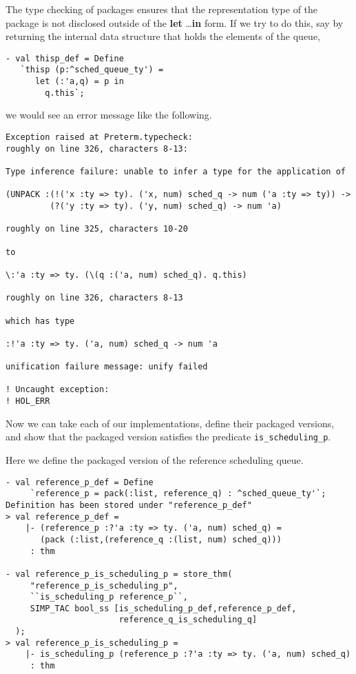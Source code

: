 The type checking of packages ensures that the representation
type of the package is not disclosed outside of the
{\bf let} \ldots {\bf in} form. If we try to do this,
say by returning the internal data structure that holds
the elements of the queue,
\begin{session}
\begin{verbatim}
- val thisp_def = Define
   `thisp (p:^sched_queue_ty') =
      let (:'a,q) = p in
        q.this`;
\end{verbatim}
\end{session}

\noindent
we would see an error message like the following.
\begin{session}
\begin{verbatim}
Exception raised at Preterm.typecheck:
roughly on line 326, characters 8-13:

Type inference failure: unable to infer a type for the application of

(UNPACK :(!('x :ty => ty). ('x, num) sched_q -> num ('a :ty => ty)) ->
         (?('y :ty => ty). ('y, num) sched_q) -> num 'a)

roughly on line 325, characters 10-20

to

\:'a :ty => ty. (\(q :('a, num) sched_q). q.this)

roughly on line 326, characters 8-13

which has type

:!'a :ty => ty. ('a, num) sched_q -> num 'a

unification failure message: unify failed

! Uncaught exception: 
! HOL_ERR
\end{verbatim}
\end{session}

Now we can take each of our implementations, define their
packaged versions, and show that the packaged version satisfies
the predicate {\tt is\_scheduling\_p}.

Here we define the packaged version of the reference scheduling
queue.
\begin{session}
\begin{verbatim}
- val reference_p_def = Define
     `reference_p = pack(:list, reference_q) : ^sched_queue_ty'`;
Definition has been stored under "reference_p_def"
> val reference_p_def =
    |- (reference_p :?'a :ty => ty. ('a, num) sched_q) =
       (pack (:list,(reference_q :(list, num) sched_q)))
     : thm

- val reference_p_is_scheduling_p = store_thm(
     "reference_p_is_scheduling_p",
     ``is_scheduling_p reference_p``,
     SIMP_TAC bool_ss [is_scheduling_p_def,reference_p_def,
                       reference_q_is_scheduling_q]
  );
> val reference_p_is_scheduling_p =
    |- is_scheduling_p (reference_p :?'a :ty => ty. ('a, num) sched_q)
     : thm
\end{verbatim}
\end{session}


